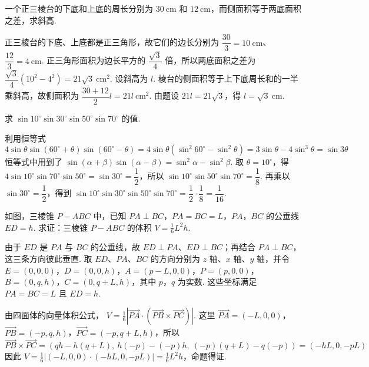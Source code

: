 \documentclass[UTF8,a4paper,oneside,11pt]{ctexbook}
\begin{document}
\begin{problem}

一个正三棱台的下底和上底的周长分别为 \(30 \mathrm{~cm}\) 和 \(12 \mathrm{~cm}\)，而侧面积等于两底面积之差，求斜高.
\end{problem}

\begin{solution}
正三棱台的下底、上底都是正三角形，故它们的边长分别为
\(\dfrac{30}{3}=10\mathrm{~cm}\)、\(\dfrac{12}{3}=4\mathrm{~cm}\). 正三角形面积为边长平方的 \(\dfrac{\sqrt3}{4}\) 倍，所以两底面积之差为
\(\dfrac{\sqrt3}{4}\left(10^2-4^2\right)=21\sqrt3\mathrm{~cm}^2\).
设斜高为 \(l\). 棱台的侧面积等于上下底周长和的一半乘斜高，故侧面积为
\(\dfrac{30+12}{2}l=21l\mathrm{~cm}^2\). 由题设 \(21l=21\sqrt3\)，得 \(l=\sqrt3\mathrm{~cm}\).
\end{solution}

\begin{problem}

求 \(\sin 10^\circ \sin 30^\circ \sin 50^\circ \sin 70^\circ\) 的值.
\end{problem}

\begin{solution}
利用恒等式
\[
4\sin\theta\sin\left(60^\circ+\theta\right)\sin\left(60^\circ-\theta\right)
=4\sin\theta\left(\sin^2 60^\circ-\sin^2\theta\right)
=3\sin\theta-4\sin^3\theta
=\sin3\theta
\]
恒等式中用到了 \(\sin(\alpha+\beta)\sin(\alpha-\beta)=\sin^2\alpha-\sin^2\beta\). 取 \(\theta=10^\circ\)，得
\(4\sin10^\circ\sin70^\circ\sin50^\circ=\sin30^\circ=\dfrac12\)，所以
\(\sin10^\circ\sin50^\circ\sin70^\circ=\dfrac18\). 再乘以 \(\sin30^\circ=\dfrac12\)，得到
\(\sin10^\circ\sin30^\circ\sin50^\circ\sin70^\circ=\dfrac12\cdot\dfrac18=\dfrac1{16}\).
\end{solution}

\begin{problem}

如图，三棱锥 \(P-ABC\) 中，已知 \(PA \perp BC\)，\(PA = BC = L\)，\(PA\)，\(BC\) 的公垂线 \(ED = h\). 求证：三棱锥 \(P-ABC\) 的体积 \(V = \frac{1}{6}L^2h\).
\end{problem}

\begin{solution}
由于 \(ED\) 是 \(PA\) 与 \(BC\) 的公垂线，故 \(ED\perp PA\)、\(ED\perp BC\)；再结合 \(PA\perp BC\)，这三条方向彼此垂直. 取 \(ED\)、\(PA\)、\(BC\) 的方向分别为 \(z\) 轴、\(x\) 轴、\(y\) 轴，并令
\(E=(0,0,0)\)，\(D=(0,0,h)\)，\(A=(p-L,0,0)\)，\(P=(p,0,0)\)，\(B=(0,q,h)\)，\(C=(0,q+L,h)\)，其中 \(p\)，\(q\) 为实数. 这些坐标满足 \(PA=BC=L\) 且 \(ED=h\).

由四面体的向量体积公式，
\(V=\frac16\left|\overrightarrow{PA}\cdot\left(\overrightarrow{PB}\times\overrightarrow{PC}\right)\right|\). 这里 \(\overrightarrow{PA}=(-L,0,0)\)，\(\overrightarrow{PB}=(-p,q,h)\)，\(\overrightarrow{PC}=(-p,q+L,h)\)，所以
\[
\overrightarrow{PB}\times\overrightarrow{PC}
=\left(qh-h(q+L),\ h(-p)-(-p)h,\ (-p)(q+L)-q(-p)\right)
=(-hL,0,-pL)
\]
因此
\(V=\frac16\left|(-L,0,0)\cdot(-hL,0,-pL)\right|=\frac16L^2h\)，命题得证.
\end{solution}
\end{document}

